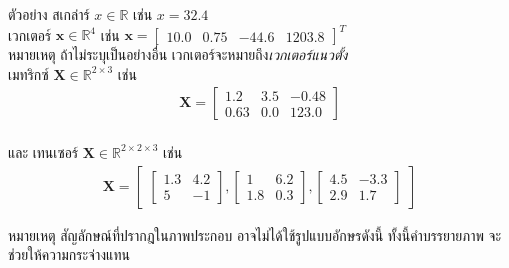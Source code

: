 ตัวอย่าง
สเกล่าร์ $x \in \mathbb{R}$ เช่น
$
x = 32.4
$
\\
%
เวกเตอร์ $\bm{x} \in \mathbb{R}^4$ เช่น
$\bm{x} = \begin{bmatrix}
10.0 & 0.75 & -44.6 & 1203.8
\end{bmatrix}^T
$
\\
หมายเหตุ ถ้าไม่ระบุเป็นอย่างอื่น เวกเตอร์จะหมายถึง\textit{เวกเตอร์แนวตั้ง}
\\
%
เมทริกซ์ $\bm{X} \in \mathbb{R}^{2 \times 3}$ เช่น
\begin{eqnarray}
\bm{X} = \begin{bmatrix}
1.2 & 3.5 & -0.48 \\
0.63 & 0.0 & 123.0
\end{bmatrix}
\nonumber
\end{eqnarray}
\\
%
และ
%
เทนเซอร์ 
$\bm{X} \in \mathbb{R}^{2 \times 2 \times 3}$ เช่น
\begin{eqnarray}
\bm{X} = \begin{bmatrix}
\begin{bmatrix}
1.3 & 4.2 \\
5 & -1
\end{bmatrix}
,
\begin{bmatrix}
1 & 6.2 \\
1.8 & 0.3
\end{bmatrix}
,
\begin{bmatrix}
4.5 & -3.3 \\
2.9 & 1.7
\end{bmatrix}
\end{bmatrix}
\nonumber
\end{eqnarray}

หมายเหตุ สัญลักษณ์ที่ปรากฎในภาพประกอบ อาจไม่ได้ใช้รูปแบบอักษรดังนี้ ทั้งนี้คำบรรยายภาพ จะช่วยให้ความกระจ่างแทน





\vfill
\begin{Parallel}[c]{0.48\textwidth}{0.48\textwidth}
\end{Parallel}


